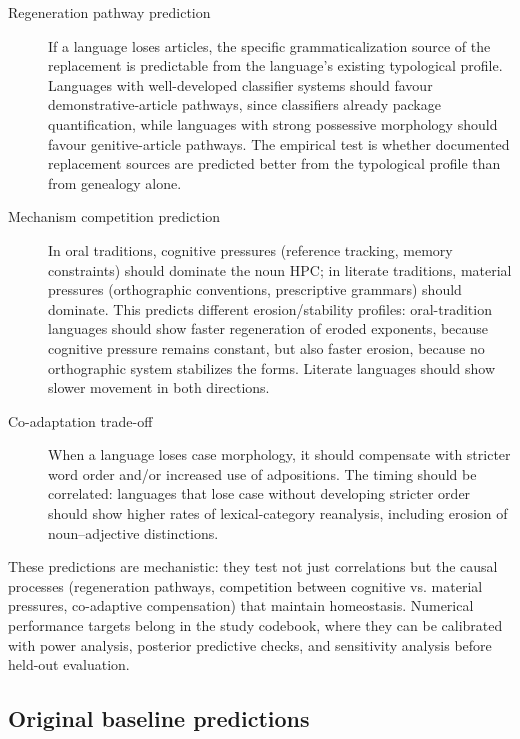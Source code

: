 \documentclass[12pt]{article}
\begin{document}
\begin{description}
  \item[Regeneration pathway prediction] If a language loses articles, the specific grammaticalization source of the replacement is predictable from the language's existing typological profile. Languages with well-developed classifier systems should favour demonstrative-article pathways, since classifiers already package quantification, while languages with strong possessive morphology should favour genitive-article pathways. The empirical test is whether documented replacement sources are predicted better from the typological profile than from genealogy alone.
  
  \item[Mechanism competition prediction] In oral traditions, cognitive pressures (reference tracking, memory constraints) should dominate the noun HPC; in literate traditions, material pressures (orthographic conventions, prescriptive grammars) should dominate. This predicts different erosion/stability profiles: oral-tradition languages should show faster regeneration of eroded exponents, because cognitive pressure remains constant, but also faster erosion, because no orthographic system stabilizes the forms. Literate languages should show slower movement in both directions.
  
  \item[Co-adaptation trade-off] When a language loses case morphology, it should compensate with stricter word order and/or increased use of adpositions. The timing should be correlated: languages that lose case without developing stricter order should show higher rates of lexical-category reanalysis, including erosion of noun--adjective distinctions.
\end{description}

These predictions are mechanistic: they test not just correlations but the causal processes (regeneration pathways, competition between cognitive vs. material pressures, co-adaptive compensation) that maintain homeostasis. Numerical performance targets belong in the study codebook, where they can be calibrated with power analysis, posterior predictive checks, and sensitivity analysis before held-out evaluation.

\subsection{Original baseline predictions}\label{subsec:baseline-predictions}
\end{document}

